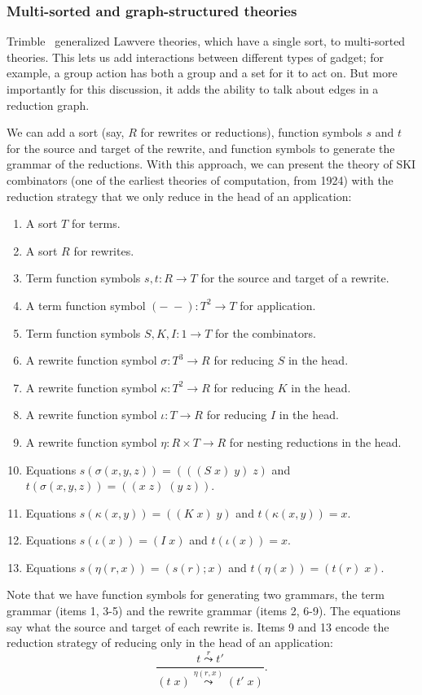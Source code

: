 \documentclass{article}
\begin{document}
\subsubsection{Multi-sorted and graph-structured theories}

Trimble~\cite{Trimble2018} generalized Lawvere theories, which have a single sort, to multi-sorted theories.  This lets us add interactions between different types of gadget; for example, a group action has both a group and a set for it to act on.  But more importantly for this discussion, it adds the ability to talk about edges in a reduction graph.

We can add a sort (say, $R$ for rewrites or reductions), function symbols $s$ and $t$ for the source and target of the rewrite, and function symbols to generate the grammar of the reductions.  With this approach, we can present the theory of SKI combinators (one of the earliest theories of computation, from 1924) with the reduction strategy that we only reduce in the head of an application:
\begin{enumerate}
    \item A sort $T$ for terms.
    \item A sort $R$ for rewrites.
    \item Term function symbols $s, t\colon R \to T$ for the source and target of a rewrite.
    \item A term function symbol $(-\; -)\colon T^2 \to T$ for application.
    \item Term function symbols $S, K, I\colon 1 \to T$ for the combinators.
    \item A rewrite function symbol $\sigma\colon T^3 \to R$ for reducing $S$ in the head.
    \item A rewrite function symbol $\kappa\colon T^2 \to R$ for reducing $K$ in the head.
    \item A rewrite function symbol $\iota\colon T \to R$ for reducing $I$ in the head.
    \item A rewrite function symbol $\eta\colon R \times T \to R$ for nesting reductions in the head.
    \item Equations $s(\sigma(x, y, z)) = (((S\; x)\; y)\; z)$ and $t(\sigma(x, y, z)) = ((x\; z)\; (y\; z)).$
    \item Equations $s(\kappa(x, y)) = ((K\; x)\; y)$ and $t(\kappa(x, y)) = x.$
    \item Equations $s(\iota(x)) = (I\; x)$ and $t(\iota(x)) = x.$
    \item Equations $s(\eta(r, x)) = (s(r); x)$ and $t(\eta(x)) = (t(r)\; x).$
\end{enumerate}
Note that we have function symbols for generating two grammars, the term grammar (items 1, 3-5) and the rewrite grammar (items 2, 6-9).  The equations say what the source and target of each rewrite is.  Items 9 and 13 encode the reduction strategy of reducing only in the head of an application:
\[ \frac{t \stackrel{r}{\leadsto} t'}{(t\; x) \stackrel{\eta(r, x)}{\leadsto} (t'\; x)}. \]
\end{document}
